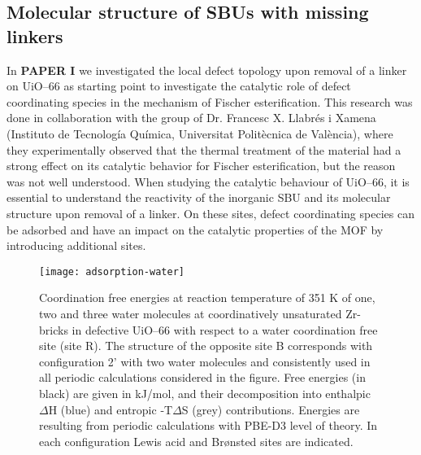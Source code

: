 \subsection*{Molecular structure of SBUs with missing linkers}
In \textbf{PAPER I} we investigated the local defect topology upon removal of a linker on UiO--66 as starting point to investigate the catalytic role of defect coordinating species in the mechanism of Fischer esterification. This research was done in collaboration with the group of Dr. Francesc X. Llabr\'es i Xamena (Instituto de Tecnolog\'{i}a Qu\'{i}mica, Universitat Polit\`ecnica de Val\`encia), where they experimentally observed that the thermal treatment of the material had a strong effect on its catalytic behavior for Fischer esterification, but the reason was not well understood. When studying the catalytic behaviour of UiO--66, it is essential to understand the reactivity of the inorganic SBU and its molecular structure upon removal of a linker. On these sites, defect coordinating species can be adsorbed and have an impact on the catalytic properties of the MOF by introducing additional sites. 
\begin{figure}[!htbp]
	\centering
	\texttt{[image: adsorption-water]}
	\caption{Coordination free energies at reaction temperature of 351 K of one, two and three water molecules at coordinatively unsaturated Zr-bricks in defective UiO--66 with respect to a water coordination free site (site R). The structure of the opposite site B corresponds with configuration 2’ with two water molecules and consistently used in all periodic calculations considered in the figure. Free energies (in black) are given in kJ/mol, and their decomposition into enthalpic $\Delta$H (blue) and entropic -T$\Delta$S (grey) contributions. Energies are resulting from periodic calculations with PBE-D3 level of theory. In each configuration Lewis acid and Brønsted sites are indicated.}
	\label{fig:adsorption-water}
\end{figure}
